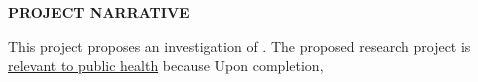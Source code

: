 {\noindent \bf \Large PROJECT NARRATIVE}

This project proposes an investigation of \xx.
% 
The proposed research project is \ul{relevant to public health} because
% 
Upon completion, \xx